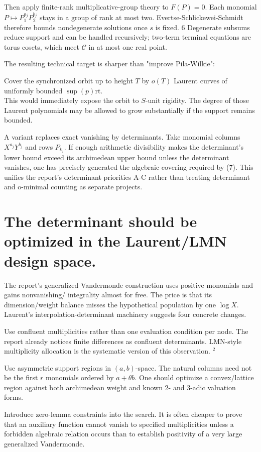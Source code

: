 \documentclass[10pt]{article}
\begin{document}
Then apply finite-rank multiplicative-group theory to $F(P)=0$. Each monomial $P \mapsto P_{1}^{a_{j}} P_{2}^{b_{j}}$ stays in a group of rank at most two. Evertse-Schlickewei-Schmidt therefore bounds nondegenerate solutions once $s$ is fixed. 6 Degenerate subsums reduce support and can be handled recursively; two-term terminal equations are torus cosets, which meet $\mathcal{C}$ in at most one real point.

The resulting technical target is sharper than "improve Pila-Wilkie":

Cover the synchronized orbit up to height $T$ by $o(T)$ Laurent curves of uniformly bounded $\sup (p) \mathrm{rt}$.\\
This would immediately expose the orbit to $S$-unit rigidity. The degree of those Laurent polynomials may be allowed to grow substantially if the support remains bounded.

A variant replaces exact vanishing by determinants. Take monomial columns $X^{a_{j}} Y^{b_{j}}$ and rows $P_{k_{i}}$. If enough arithmetic divisibility makes the determinant's lower bound exceed its archimedean upper bound unless the determinant vanishes, one has precisely generated the algebraic covering required by (7). This unifies the report's determinant priorities A-C rather than treating determinant and o-minimal counting as separate projects.

\section*{The determinant should be optimized in the Laurent/LMN design space.}
The report's generalized Vandermonde construction uses positive monomials and gains nonvanishing/ integrality almost for free. The price is that its dimension/weight balance misses the hypothetical population by one $\log X$. Laurent's interpolation-determinant machinery suggests four concrete changes.

Use confluent multiplicities rather than one evaluation condition per node. The report already notices finite differences as confluent determinants. LMN-style multiplicity allocation is the systematic version of this observation. ${ }^{2}$

Use asymmetric support regions in $(a, b)$-space. The natural columns need not be the first $r$ monomials ordered by $a+\theta b$. One should optimize a convex/lattice region against both archimedean weight and known 2- and 3-adic valuation forms.

Introduce zero-lemma constraints into the search. It is often cheaper to prove that an auxiliary function cannot vanish to specified multiplicities unless a forbidden algebraic relation occurs than to establish positivity of a very large generalized Vandermonde.
\end{document}
